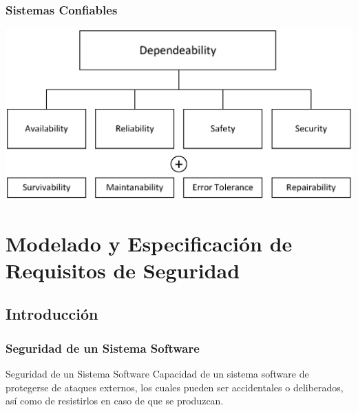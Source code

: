 \documentclass[handout,a4paper,slidestop,xcolor=pst,dvips,blue]{beamer}
\begin{document}
\begin{frame}[c]
    \frametitle{Sistemas Confiables}
    \begin{center}
        \includegraphics[width=\linewidth]{images/sociotecnicos/dependeability.eps}
    \end{center}
\end{frame}

\section{Modelado y Especificación de Requisitos de Seguridad}

\subsection{Introducción}

\begin{frame}[c]
    \frametitle{Seguridad de un Sistema Software~\cite{sommerville:2010}}
    \begin{block}{Seguridad de un Sistema Software}
        Capacidad de un sistema software de protegerse de ataques externos, los cuales pueden ser accidentales o deliberados,
         así como de resistirlos en caso de que se produzcan.
    \end{block}
\end{frame}
\end{document}

